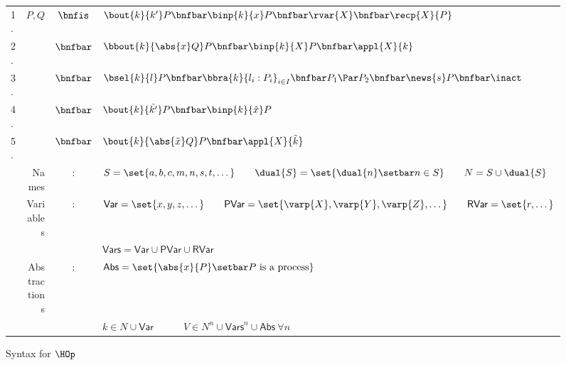 \begin{figure}[t!]
		\begin{tabular}{lrcl}
			1. &	$P,Q$
			 	&$\bnfis$&	$\bout{k}{k'} P \bnfbar \binp{k}{x} P \bnfbar \rvar{X} \bnfbar \recp{X}{P}$ \\
			2. & 	&$\bnfbar$&	$\bbout{k}{\abs{x} Q} P \bnfbar \binp{k}{X} P \bnfbar \appl{X}{k}$ \\ 
			3. & 	&$\bnfbar$&	$\bsel{k}{l} P \bnfbar \bbra{k}{l_i:P_i}_{i \in I} \bnfbar 
						P_1 \Par P_2 \bnfbar \news{s} P \bnfbar \inact$ \\
			4. & 	&$\bnfbar$&	$\bout{k}{\tilde{k'}} P \bnfbar \binp{k}{\tilde{x}} P$\\
			5. & 	&$\bnfbar$&	$\bout{k}{\abs{\tilde{x}} Q} P \bnfbar \appl{X}{\tilde{k}}$\\
		&	Names & : & 	$S = \set{a, b, c, m, n, s, t, \dots} \qquad \dual{S} = \set{\dual{n} \setbar n \in S} \qquad N = S \cup \dual{S}$\\
		&	Variables & : &	$\mathsf{Var} = \set{x,y,z, \dots} \qquad \mathsf{PVar} = \set{\varp{X}, \varp{Y}, \varp{Z}, \dots}
					\qquad \mathsf{RVar} = \set{r, \dots}$\\
		&		& &	$\mathsf{Vars} = \mathsf{Var} \cup \mathsf{PVar} \cup \mathsf{RVar}$\\
		&	Abstractions & : & $\mathsf{Abs} = \set{\abs{x}{P} \setbar P \textrm{ is a process}}$\\
		&		& &	$k \in N \cup \mathsf{Var} \quad \qquad V \in N^n \cup \mathsf{Vars}^n \cup \mathsf{Abs}\ \forall n$
		\end{tabular}
	\caption{Syntax for $\HOp$ \label{fig:syntax}}
\end{figure}

